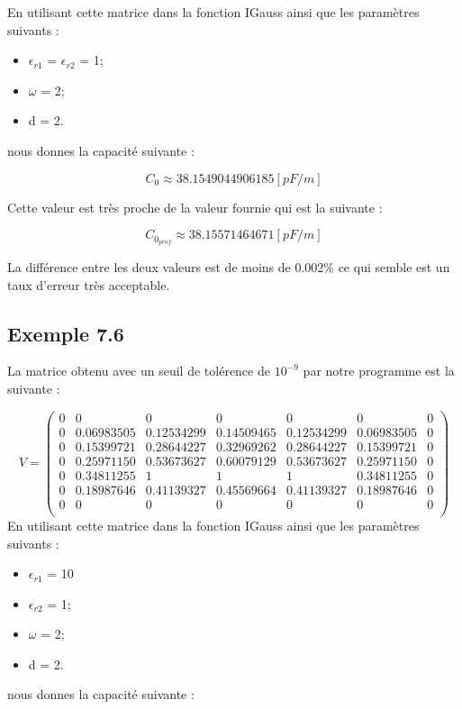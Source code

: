 En utilisant cette matrice dans la fonction IGauss ainsi que les paramètres suivants : 

\begin{itemize}
\item $\epsilon_{r1}$ = $\epsilon_{r2}$ = 1;
\item $\omega$ = 2;
\item d = 2.
\end{itemize}
nous donnes la capacité suivante :

\begin{equation}
	C_0 \approx 38.1549044906185 [pF/m]
\end{equation}

Cette valeur est très proche de la valeur fournie qui est la suivante :

\begin{equation}
	C_{0_{prof}} \approx 38.15571464671 [pF/m]
\end{equation}

La différence entre les deux valeurs est de moins de 0.002\% ce qui semble est un taux d'erreur très acceptable.
\subsection{Exemple 7.6}
La matrice obtenu avec un seuil de tolérence de $10^{-9}$ par notre programme est la suivante : 

\[V  = \left(\begin{array}{ccccccc}
0 & 0 			& 0 			& 0 			& 0 			& 0 			& 0 \\
0 & 0.06983505 	& 0.12534299 	& 0.14509465	& 0.12534299	& 0.06983505 	& 0 \\
0 & 0.15399721 	& 0.28644227 	& 0.32969262 	& 0.28644227 	& 0.15399721 	& 0 \\
0 & 0.25971150 	& 0.53673627 	& 0.60079129  	& 0.53673627 	& 0.25971150 	& 0 \\
0 & 0.34811255 	& 1				& 1				& 1			 	& 0.34811255 	& 0 \\
0 & 0.18987646 	& 0.41139327 	& 0.45569664	& 0.41139327 	& 0.18987646 	& 0 \\
0 & 0 			& 0 			& 0 			& 0 			& 0 			& 0 \\
\end{array} \right)\]
\newline
\newline
En utilisant cette matrice dans la fonction IGauss ainsi que les paramètres suivants : 

\begin{itemize}
\item $\epsilon_{r1}$ = 10
\item $\epsilon_{r2}$ = 1;
\item $\omega$ = 2;
\item d = 2.
\end{itemize}
nous donnes la capacité suivante :


